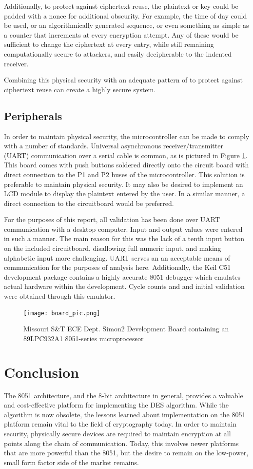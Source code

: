 \documentclass[conference]{IEEEtran}
\begin{document}
Additionally, to protect against ciphertext reuse, the plaintext or key could be padded with a nonce for additional obscurity. For example, the time of day could be used, or an algorithmically generated sequence, or even something as simple as a counter that increments at every encryption attempt. Any of these would be sufficient to change the ciphertext at every entry, while still remaining computationally secure to attackers, and easily decipherable to the indented receiver.

Combining this physical security with an adequate pattern of to protect against ciphertext reuse can create a highly secure system.

\subsection{Peripherals}
In order to maintain physical security, the microcontroller can be made to comply with a number of standards. Universal asynchronous receiver/transmitter (UART) communication over a serial cable is common, as is pictured in Figure \ref{fig:board_pic}. This board comes with push buttons soldered directly onto the circuit board with direct connection to the P1 and P2 buses of the microcontroller. This solution is preferable to maintain physical security. It may also be desired to implement an LCD module to display the plaintext entered by the user. In a similar manner, a direct connection to the circuitboard would be preferred.

For the purposes of this report, all validation has been done over UART communication with a desktop computer. Input and output values were entered in such a manner. The main reason for this was the lack of a tenth input button on the included circuitboard, disallowing full numeric input, and making alphabetic input more challenging. UART serves an an acceptable means of communication for the purposes of analysis here. Additionally, the Keil C51 development package contains a highly accurate 8051 debugger which emulates actual hardware within the development. Cycle counts and and initial validation were obtained through this emulator.

\begin{figure}[ht]
	\centering
  \texttt{[image: board\_pic.png]}
  \caption{Missouri S\&T ECE Dept. Simon2 Development Board containing an 89LPC932A1 8051-series microprocessor}
  \label{fig:board_pic}
\end{figure}

\section{Conclusion}
The 8051 architecture, and the 8-bit architecture in general, provides a valuable and cost-effective platform for implementing the DES algorithm. While the algorithm is now obsolete, the lessons learned about implementation on the 8051 platform remain vital to the field of cryptography today. In order to maintain security, physically secure devices are required to maintain encryption at all points along the chain of communication. Today, this involves newer platforms that are more powerful than the 8051, but the desire to remain on the low-power, small form factor side of the market remains.
\end{document}
